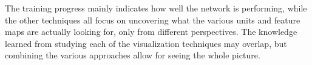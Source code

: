 The training progress mainly indicates how well the network is performing, while the other techniques all focus on uncovering what the various units and feature maps are actually looking for, only from different perspectives. The knowledge learned from studying each of the visualization techniques may overlap, but combining the various approaches allow for seeing the whole picture.


\begin{comment}

RQ 1:How can we develop a visualization tool to improve the understanding of the behaviour of an artificial neural network?

RO 1.1: Examine existing tools in order to uncover shortcomings.
RO 1.2: Identify visualization techniques that can be used to improve the understanding of an artificial neural network.
RO 1.3: Develop a tool that incorporates the techniques found in 1.2 and addresses the shortcomings identified in 1.1.

\end{comment}




